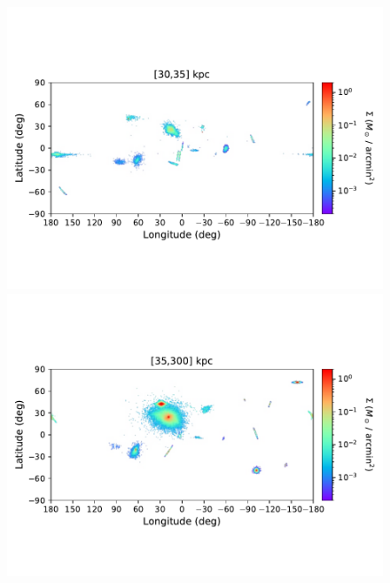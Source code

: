 \begin{figure}[h!]
\begin{center}
            \includegraphics[clip=true, trim = 0mm 15mm 0mm 20mm, width=\columnwidth]{images/PII_ensemble_LB_D30-35_mass_est_new.pdf}
            \includegraphics[clip=true, trim = 0mm 15mm 0mm 20mm, width=\columnwidth]{images/PII_ensemble_LB_D35-300_mass_est_new.pdf}



\end{center}
\end{figure}
